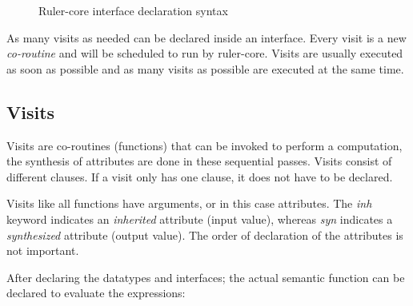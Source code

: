 \documentclass[twoside, titlepage, openright, a4paper]{book}
\newcommand{\Varid}[1]{\mathit{#1}}
\def\resethooks{%
  \global\let\SaveRestoreHook\empty
  \global\let\ColumnHook\empty}
\newcommand{\hsindent}[1]{\quad}%
\let\hspre\empty
\let\hspost\empty
\begin{document}
\begin{figure}[h!]
\resethooks
\caption{Ruler-core interface declaration syntax}
\label{itf:syntax}
\end{figure}

As many visits as needed can be declared inside an interface. Every visit is a new \emph{co-routine} and will be scheduled to run by ruler-core. Visits are usually executed as soon as possible and as many visits as possible are executed at the same time. %

\subsection{Visits}
Visits are co-routines (functions) that can be invoked to perform a computation, the synthesis of attributes are done in these sequential passes. Visits consist of different clauses. If a visit only has one clause, it does not have to be declared. 

Visits like all functions have arguments, or in this case attributes. The \emph{inh} keyword indicates an \emph{inherited} attribute (input value), whereas \emph{syn} indicates a \emph{synthesized} attribute (output value). The order of declaration of the attributes is not important.

After declaring the datatypes and interfaces; the actual semantic function can be declared to evaluate the expressions:
\end{document}
